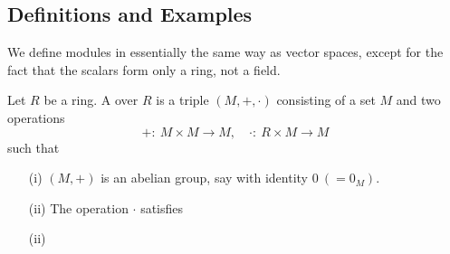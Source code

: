 \documentclass[egregdoesnotlikesansseriftitles,a4paper]{scrartcl}
\begin{document}
\subsection{Definitions and Examples}
We define modules in essentially the same way as vector spaces, except for the fact that the scalars form only a ring, not a field.
\begin{definition*}[Module]
       Let $R$ be a ring. A  over $R$ is a triple $(M, +, \cdot )$ consisting of a set $M$ and two operations \[
       +: \ M \times M \rightarrow M, \quad \cdot : \ R \times M \rightarrow M
       \] such that
       \begin{itemize}
             \item[(i)] $(M,+)$ is an abelian group, say with identity $0 \ (=0_{M})$.
             \item[(ii)] The operation $\cdot $ satisfies 
             \item[(ii)] 
       \end{itemize}
\end{definition*}
\end{document}
